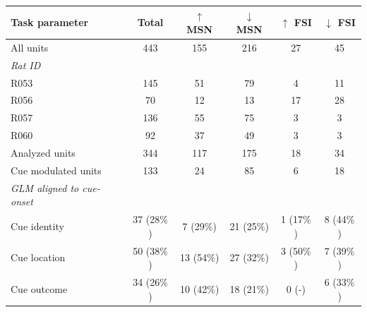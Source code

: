\documentclass[11pt]{article}
\newcommand{\bsf}[1]{\textbf{#1}}
\begin{document}
\begin{table}[p]
\centering
\setlength{\tabcolsep}{1 em} %
\begin{tabular}{l c  c c c c}

\bsf{Task parameter}                                 & \bsf{Total}        & \bsf{$\uparrow$ MSN}        & \bsf{$\downarrow$ MSN}        & \bsf{$\uparrow$ FSI}       & \bsf{$\downarrow$ FSI}\\
\hline
All units                       & 443        & 155         & 216          & 27          & 45\\
\hline
\textit{Rat ID}                       &         &       &          &          &\\
\hline
\hspace{3mm}R053                       & 145         & 51          & 79          & 4         & 11\\
\hline
\hspace{3mm}R056                       & 70         & 12          & 13         & 17          & 28\\
\hline
\hspace{3mm}R057   	          & 136         & 55          & 75          & 3          & 3\\
\hline
\hspace{3mm}R060                       & 92         & 37          & 49          & 3          & 3\\
\hline 
Analyzed units                       & 344        & 117         & 175         & 18         & 34\\
\hline
Cue modulated units                      & 133         &24          &85          & 6          &18\\
\hline
\hspace{3mm}\textit{GLM aligned to cue-onset}                       &         &       &          &          &\\
\hline
\hspace{6mm}Cue identity       & 37 (28$\%$)        & 7 (29$\%$)          & 21 (25$\%$)          & 1 (17$\%$)          & 8 (44$\%$)\\
\hline
\hspace{6mm}Cue location       & 50 (38$\%$)       &13 (54$\%$)          & 27 (32$\%$)          & 3 (50$\%$)          & 7 (39$\%$)\\
\hline
\hspace{6mm}Cue outcome       & 34 (26$\%$)         & 10 (42$\%$)          & 18 (21$\%$)        & 0 (-)          & 6 (33$\%$)\\

\end{tabular}
\end{table}
\end{document}
